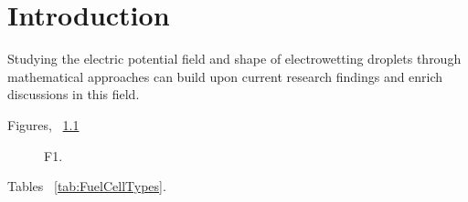 \chapter{Introduction}
Studying the electric potential field and shape of electrowetting droplets through mathematical approaches can build upon current research findings and enrich discussions in this field.
\iffalse

Figures, ~\ref{fig:TPBs}

\begin{figure}[H] %
  \centering
  \caption{F1.}
  \label{fig:TPBs} 
\end{figure}

Tables ~\ref{tab:FuelCellTypes}.

